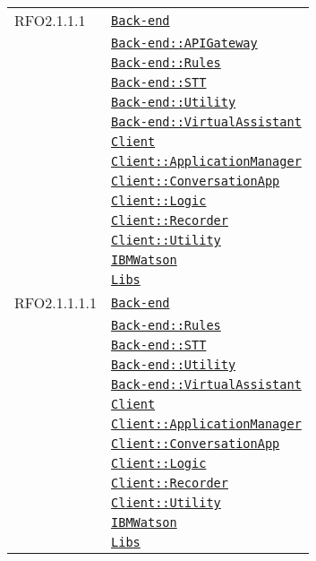 \begin{longtable}{|>{\centering}m{3cm}|m{10cm}<{\centering}|}
RFO2.1.1.1 & \hyperref[Back-end]{\texttt{Back-end}}\\
& \hyperref[Back-end::APIGateway]{\texttt{Back-end::APIGateway}}\\
& \hyperref[Back-end::Rules]{\texttt{Back-end::Rules}}\\
& \hyperref[Back-end::STT]{\texttt{Back-end::STT}}\\
& \hyperref[Back-end::Utility]{\texttt{Back-end::Utility}}\\
& \hyperref[Back-end::VirtualAssistant]{\texttt{Back-end::VirtualAssistant}}\\
& \hyperref[Client]{\texttt{Client}}\\
& \hyperref[Client::ApplicationManager]{\texttt{Client::ApplicationManager}}\\
& \hyperref[Client::ConversationApp]{\texttt{Client::ConversationApp}}\\
& \hyperref[Client::Logic]{\texttt{Client::Logic}}\\
& \hyperref[Client::Recorder]{\texttt{Client::Recorder}}\\
& \hyperref[Client::Utility]{\texttt{Client::Utility}}\\
& \hyperref[IBMWatson]{\texttt{IBMWatson}}\\
& \hyperref[Libs]{\texttt{Libs}}\\ \hline

RFO2.1.1.1.1 & \hyperref[Back-end]{\texttt{Back-end}}\\
& \hyperref[Back-end::Rules]{\texttt{Back-end::Rules}}\\
& \hyperref[Back-end::STT]{\texttt{Back-end::STT}}\\
& \hyperref[Back-end::Utility]{\texttt{Back-end::Utility}}\\
& \hyperref[Back-end::VirtualAssistant]{\texttt{Back-end::VirtualAssistant}}\\
& \hyperref[Client]{\texttt{Client}}\\
& \hyperref[Client::ApplicationManager]{\texttt{Client::ApplicationManager}}\\
& \hyperref[Client::ConversationApp]{\texttt{Client::ConversationApp}}\\
& \hyperref[Client::Logic]{\texttt{Client::Logic}}\\
& \hyperref[Client::Recorder]{\texttt{Client::Recorder}}\\
& \hyperref[Client::Utility]{\texttt{Client::Utility}}\\
& \hyperref[IBMWatson]{\texttt{IBMWatson}}\\
& \hyperref[Libs]{\texttt{Libs}}\\ \hline


\end{longtable}
